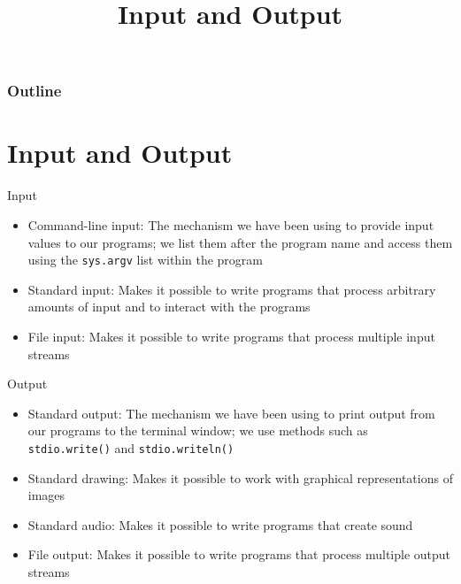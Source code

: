 \documentclass[8pt,a4paper,compress]{beamer}
\title{Input and Output}
\date{}
\begin{document}
\begin{frame}
\vfill
\titlepage
\end{frame}

\begin{frame}
\frametitle{Outline}
\tableofcontents
\end{frame}

\section{Input and Output}
\begin{frame}[fragile]
\pause

\begin{center}
\end{center}

\pause
\bigskip

Input
\begin{itemize}
\item Command-line input: The mechanism we have been using to provide
input values to our programs; we list them after the program name and access them using the \lstinline{sys.argv} list within the program
\item Standard input: Makes it possible to write programs that
process arbitrary amounts of input and to interact with the programs
\item File input: Makes it possible to write programs that process multiple input streams
\end{itemize}

\pause
\bigskip

Output
\begin{itemize}
\item Standard output: The mechanism we have been using to print output from our programs to the terminal window; we use methods such as \lstinline{stdio.write()} and \lstinline{stdio.writeln()}
\item Standard drawing: Makes it possible to work with graphical representations of images
\item Standard audio: Makes it possible to write programs that create sound
\item File output: Makes it possible to write programs that process multiple output streams
\end{itemize}
\end{frame}
\end{document}
